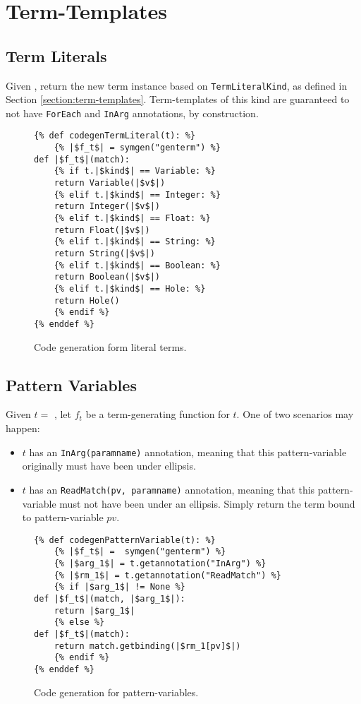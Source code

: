 \section{Term-Templates}

\subsection{Term Literals}

Given \TermLiteral, return the new term instance based on \texttt{TermLiteralKind}, as defined in Section \ref{section:term-templates}. Term-templates of this kind are guaranteed to not have \texttt{ForEach} and \texttt{InArg} annotations, by construction.

\begin{figure}[ht]
\begin{verbatim}
{% def codegenTermLiteral(t): %}
	{% |$f_t$| = symgen("genterm") %}
def |$f_t$|(match):
	{% if t.|$kind$| == Variable: %}
	return Variable(|$v$|)
	{% elif t.|$kind$| == Integer: %}
	return Integer(|$v$|)
	{% elif t.|$kind$| == Float: %}
	return Float(|$v$|)
	{% elif t.|$kind$| == String: %}
	return String(|$v$|)
	{% elif t.|$kind$| == Boolean: %}
	return Boolean(|$v$|)
	{% elif t.|$kind$| == Hole: %}
	return Hole()
	{% endif %}
{% enddef %}
\end{verbatim}
\caption{Code generation form literal terms.}
\label{codegen-term-template-lit}
\end{figure}

\subsection{Pattern Variables}

Given $t =$ \PatternVariable, let $f_t$ be a term-generating function for $t$. One of two scenarios may happen:
\begin{itemize}
\item $t$ has an \texttt{InArg(paramname)} annotation, meaning that this pattern-variable originally must have been under ellipsis.
\item $t$ has an \texttt{ReadMatch(pv, paramname)} annotation, meaning that this pattern-variable must not have been under an ellipsis. Simply return the term bound to pattern-variable $pv$.
\end{itemize}

\begin{figure}[htb]
\begin{verbatim}
{% def codegenPatternVariable(t): %}
	{% |$f_t$| =  symgen("genterm") %}
	{% |$arg_1$| = t.getannotation("InArg") %}
	{% |$rm_1$| = t.getannotation("ReadMatch") %}
	{% if |$arg_1$| != None %}
def |$f_t$|(match, |$arg_1$|):
	return |$arg_1$|
	{% else %}
def |$f_t$|(match):
	return match.getbinding(|$rm_1[pv]$|)
	{% endif %}
{% enddef %}
\end{verbatim}
\caption{Code generation for pattern-variables.}
\label{codegen-term-pv}
\end{figure}


